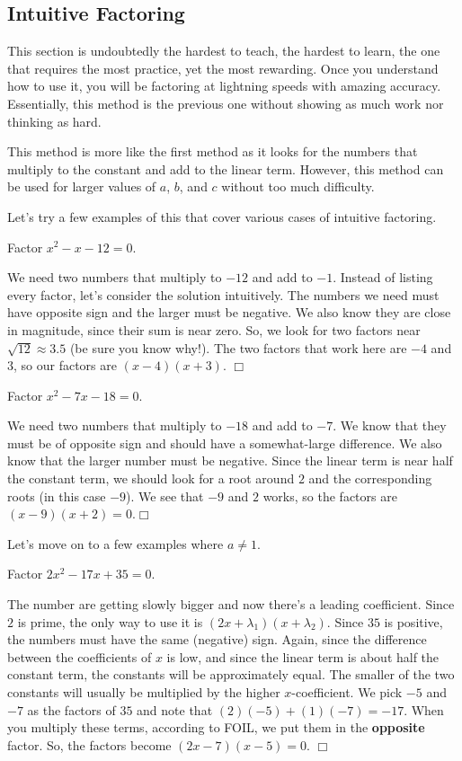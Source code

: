\documentclass[lang=en,11pt]{elegantbook}
\begin{document}
\subsection{Intuitive Factoring}
\noindent This section is undoubtedly the hardest to teach, the hardest to learn, the one that requires the most practice, yet the most rewarding.  Once you understand how to use it, you will be factoring at lightning speeds with amazing accuracy.  Essentially, this method is the previous one without showing as much work nor thinking as hard.

This method is more like the first method as it looks for the numbers that multiply to the constant and add to the linear term.  However, this method can be used for larger values of $a$, $b$, and $c$ without too much difficulty.

Let's try a few examples of this that cover various cases of intuitive factoring.
\begin{example}
Factor $x^2-x-12=0$.
\end{example}
\begin{solution}
We need two numbers that multiply to $-12$ and add to $-1$.  Instead of listing every factor, let's consider the solution intuitively.  The numbers we need must have opposite sign and the larger must be negative.  We also know they are close in magnitude, since their sum is near zero.  So, we look for two factors near $\sqrt{12}\approx 3.5$ (be sure you know why!).  The two factors that work here are $-4$ and $3$, so our factors are $(x-4)(x+3)$.  $\Box$
\end{solution}
\begin{example}
Factor $x^2-7x-18=0$.
\end{example}
\begin{solution}
We need two numbers that multiply to $-18$ and add to $-7$.  We know that they must be of opposite sign and should have a somewhat-large difference.  We also know that the larger number must be negative.  Since the linear term is near half the constant term, we should look for a root around $2$ and the corresponding roots (in this case $-9$).  We see that $-9$ and $2$ works, so the factors are $(x-9)(x+2)=0$.$\Box$
\end{solution}
Let's move on to a few examples where $a\neq 1$.
\begin{example}
Factor $2x^2-17x+35=0$.  
\end{example}
\begin{solution}
The number are getting slowly bigger and now there's a leading coefficient.  Since $2$ is prime, the only way to use it is $(2x+\lambda_1)(x+\lambda_2)$.  Since $35$ is positive, the numbers must have the same (negative) sign.  Again, since the difference between the coefficients of $x$ is low, and since the linear term is about half the constant term, the constants will be approximately equal.  The smaller of the two constants will usually be multiplied by the higher $x$-coefficient.  We pick $-5$ and $-7$ as the factors of $35$ and note that $(2)(-5)+(1)(-7)=-17$.  When you multiply these terms, according to FOIL, we put them in the \textbf{opposite} factor.  So, the factors become $(2x-7)(x-5)=0$.  $\Box$
\end{solution}
\end{document}
